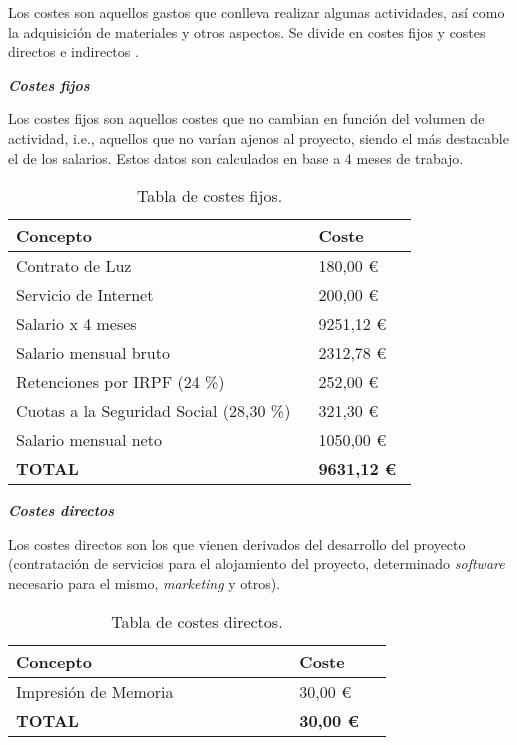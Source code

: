 Los costes son aquellos gastos que conlleva realizar algunas actividades, así como la adquisición de materiales y otros aspectos. Se divide en costes fijos y costes directos e indirectos \cite{costes}.

\textbf{\textit{Costes fijos}}

Los costes fijos son aquellos costes que no cambian en función del volumen de actividad, i.e., aquellos que no varían ajenos al proyecto, siendo el más destacable el de los salarios. Estos datos son calculados en base a 4 meses de trabajo.

\begin{table}[H]
	\centering
	\begin{tabular}{>{\raggedright}b{0.6\linewidth}>{\raggedleft\arraybackslash}b{0.2\linewidth}}
		\toprule
		\textbf{{Concepto}}  & \textbf{{Coste}} \\
		\midrule
		\small{\; Contrato de Luz} & \small{180,00 €} \\		
		\midrule
		\small{\; Servicio de Internet} & \small{200,00 €} \\		
		\midrule
		\small{\; Salario x 4 meses} & \small{9251,12 €} \\
		\cline{2-2}
		\scriptsize{\qquad Salario mensual bruto} & \scriptsize{2312,78 €} \\
		\scriptsize{\qquad Retenciones por IRPF (24 \%)} & \scriptsize{252,00 €} \\
		\scriptsize{\qquad Cuotas a la Seguridad Social (28,30 \%)} & \scriptsize{321,30 €} \\
		\scriptsize{\qquad Salario mensual neto} & \scriptsize{1050,00 €} \\
		\bottomrule
		\textbf{{\scriptsize TOTAL}}  & \textbf{\small 9631,12 €} \\
		\bottomrule
	\end{tabular}
	\caption{Tabla de costes fijos.}
\end{table}

\textbf{\textit{Costes directos}}

Los costes directos son los que vienen derivados del desarrollo del proyecto (contratación de servicios para el alojamiento del proyecto, determinado \textit{software} necesario para el mismo, \textit{marketing} y otros).

\begin{table}[H]
	\centering
	\begin{tabular}{>{\raggedright}b{0.6\linewidth}>{\raggedleft\arraybackslash}b{0.2\linewidth}}
		\toprule
		\textbf{{Concepto}}  & \textbf{{Coste}} \\
		\midrule
		\small{\scriptsize Impresión de Memoria} & \small{30,00 €} \\
		\bottomrule
		\textbf{{\scriptsize TOTAL}}  & \textbf{\small 30,00 €} \\
		\bottomrule
	\end{tabular}
	\caption{Tabla de costes directos.}
\end{table}

